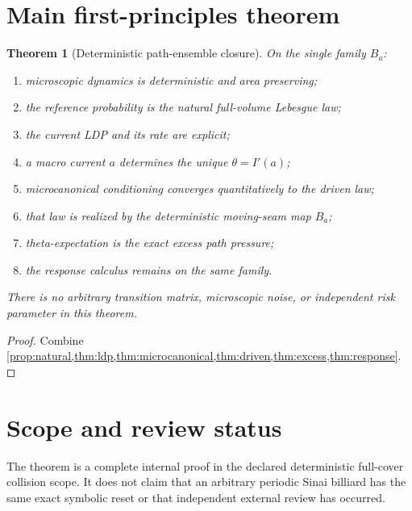 \documentclass[11pt,reqno]{amsart}
\newtheorem{theorem}{Theorem}[section]
\theoremstyle{remark}
\begin{document}
\section{Main first-principles theorem}
\begin{theorem}[Deterministic path-ensemble closure]\label{thm:main}
On the single family $B_a$:
\begin{enumerate}[label=(\roman*)]
\item microscopic dynamics is deterministic and area preserving;
\item the reference probability is the natural full-volume Lebesgue law;
\item the current LDP and its rate are explicit;
\item a macro current $a$ determines the unique $\theta=I'(a)$;
\item microcanonical conditioning converges quantitatively to the driven law;
\item that law is realized by the deterministic moving-seam map $B_a$;
\item theta-expectation is the exact excess path pressure;
\item the response calculus remains on the same family.
\end{enumerate}
There is no arbitrary transition matrix, microscopic noise, or independent
risk parameter in this theorem.
\end{theorem}
\begin{proof}
Combine \cref{prop:natural,thm:ldp,thm:microcanonical,thm:driven,thm:excess,thm:response}.
\end{proof}

\section*{Scope and review status}
The theorem is a complete internal proof in the declared deterministic
full-cover collision scope.  It does not claim that an arbitrary periodic
Sinai billiard has the same exact symbolic reset or that independent external
review has occurred.



\end{document}
